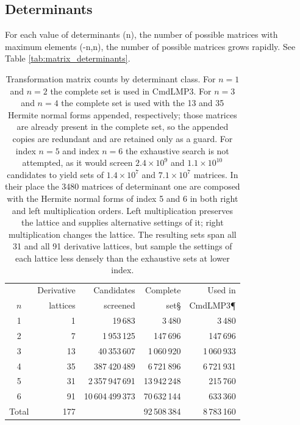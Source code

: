 \documentclass[preprint]{iucr}              %
\numberwithin{equation}{section}
\begin{document}
\subsection{Determinants}

	For each value of determinants (n), the number of possible
	matrices with maximum elements (-n,n), the number of 
	possible matrices grows rapidly. See Table \ref{tab:matrix_determinants}.
	


\begin{table}
		\label{tab:matrix_determinants}
	\caption{Transformation matrix counts by determinant class. For $n=1$ and $n=2$
		the complete set is used in CmdLMP3. For $n=3$ and $n=4$ the complete set is used with the
		13 and 35 Hermite normal forms appended, respectively; those matrices are already present in
		the complete set, so the appended copies are redundant and are retained only as
		a guard. For index $n=5$ and index $n=6$ the exhaustive search is not attempted, as it would
		screen $2.4\times10^{9}$ and $1.1\times10^{10}$ candidates to yield sets of
		$1.4\times10^{7}$ and $7.1\times10^{7}$ matrices. In their place the 3480
		matrices of determinant one are composed with the Hermite normal forms of index
		5 and 6 in both right and left multiplication orders. Left multiplication preserves the lattice
		and supplies alternative settings of it; right multiplication changes the
		lattice. The resulting sets span all 31 and all 91 derivative lattices, but
		sample the settings of each lattice less densely than the exhaustive sets at lower index.}
		
	\label{tab:matrixcounts}
	
	\vspace{2mm}
	
	\begin{tabular}{crrrr}
		\hline
		& Derivative       & Candidates          & Complete       & Used in \\
		$n$   & lattices\dag     & screened\ddag       & set\S          & CmdLMP3\P \\
		\hline
		1     &  1 &         19\,683 &        3\,480 &       3\,480 \\
		2     &  7 &   1\,953\,125 &    147\,696 &     147\,696 \\
		3     & 13 &  40\,353\,607 & 1\,060\,920 &  1\,060\,933 \\
		4     & 35 & 387\,420\,489 & 6\,721\,896 &  6\,721\,931 \\
		5     & 31 & 2\,357\,947\,691 & 13\,942\,248 &  215\,760 \\
		6     & 91 & 10\,604\,499\,373 & 70\,632\,144 &  633\,360 \\
		\hline
		Total & 177 & & 92\,508\,384 & 8\,783\,160 \\
		\hline
	\end{tabular}
	

\end{table}
\end{document}
